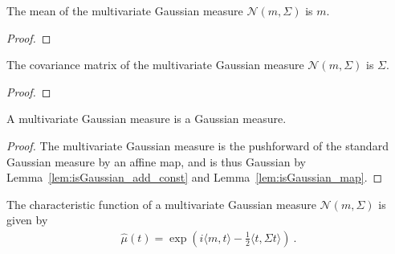 \begin{lemma}\label{lem:integral_id_multivariateGaussian}
  \mathlibok
The mean of the multivariate Gaussian measure $\mathcal{N}(m, \Sigma)$ is $m$.
\end{lemma}

\begin{proof}\mathlibok

\end{proof}


\begin{lemma}\label{lem:covMatrix_multivariateGaussian}
  \mathlibok
The covariance matrix of the multivariate Gaussian measure $\mathcal{N}(m, \Sigma)$ is $\Sigma$.
\end{lemma}

\begin{proof}\mathlibok

\end{proof}


\begin{lemma}\label{lem:isGaussian_multivariateGaussian}
  \mathlibok
A multivariate Gaussian measure is a Gaussian measure.
\end{lemma}

\begin{proof}\mathlibok
The multivariate Gaussian measure is the pushforward of the standard Gaussian measure by an affine map, and is thus Gaussian by Lemma~\ref{lem:isGaussian_add_const} and Lemma~\ref{lem:isGaussian_map}.
\end{proof}


\begin{theorem}\label{thm:charFun_multivariateGaussian}
  \mathlibok
The characteristic function of a multivariate Gaussian measure $\mathcal{N}(m, \Sigma)$ is given by
\begin{align*}
  \hat{\mu}(t) = \exp\left(i \langle m, t \rangle - \frac{1}{2} \langle t, \Sigma t \rangle\right)
  \: .
\end{align*}
\end{theorem}

